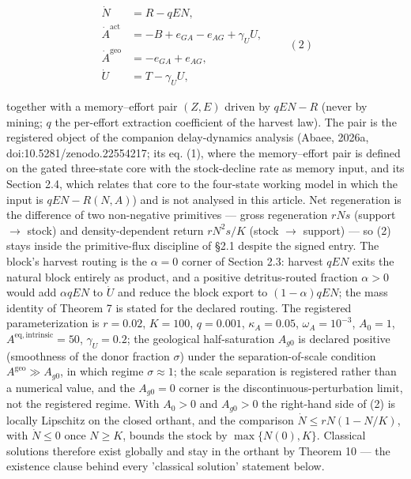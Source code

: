 \documentclass[11pt]{article}
\begin{document}
$$\begin{aligned} \dot N &= R - qEN, \\ \dot A^{\mathrm{act}} &= -B + e_{GA} - e_{AG} + \gamma_U U, \\ \dot A^{\mathrm{geo}} &= -e_{GA} + e_{AG}, \\ \dot U &= T - \gamma_U U, \end{aligned} \qquad (2)$$

 together with a memory--effort pair \((Z, E)\) driven by \(qEN - R\) (never by mining; \(q\) the per-effort extraction coefficient of the harvest law). The pair is the registered object of the companion delay-dynamics analysis (Abaee, 2026a, doi:10.5281/\allowbreak{}zenodo.22554217; its eq. (1), where the memory--effort pair is defined on the gated three-state core with the stock-decline rate as memory input, and its Section 2.4, which relates that core to the four-state working model in which the input is \(qEN - R(N, A)\)) and is not analysed in this article. Net regeneration is the difference of two non-negative primitives --- gross regeneration \(rNs\) (support \(\to\) stock) and density-dependent return \(rN^2s/\allowbreak{}K\) (stock \(\to\) support) --- so (2) stays inside the primitive-flux discipline of \S2.1 despite the signed entry. The block's harvest routing is the \(\alpha = 0\) corner of Section 2.3: harvest \(qEN\) exits the natural block entirely as product, and a positive detritus-routed fraction \(\alpha > 0\) would add \(\alpha qEN\) to \(\dot U\) and reduce the block export to \((1-\alpha)qEN\); the mass identity of Theorem 7 is stated for the declared routing. The registered parameterization is \(r = 0.02\), \(K = 100\), \(q = 0.001\), \(\kappa_A = 0.05\), \(\omega_A = 10^{-3}\), \(A_0 = 1\), \(A^{\mathrm{eq,\allowbreak{}intrinsic}} =\allowbreak{} 50\), \(\gamma_U = 0.2\); the geological half-saturation \(A_{g0}\) is declared positive (smoothness of the donor fraction \(\sigma\)) under the separation-of-scale condition \(A^{\mathrm{geo}} \gg A_{g0}\), in which regime \(\sigma \approx 1\); the scale separation is registered rather than a numerical value, and the \(A_{g0} = 0\) corner is the discontinuous-perturbation limit, not the registered regime. With \(A_0>0\) and \(A_{g0}>0\) the right-hand side of (2) is locally Lipschitz on the closed orthant, and the comparison \(\dot N\le rN(1-N/\allowbreak{}K)\), with \(\dot N\le0\) once \(N\ge K\), bounds the stock by \(\max\{N(0),K\}\). Classical solutions therefore exist globally and stay in the orthant by Theorem 10 --- the existence clause behind every 'classical solution' statement below.
\end{document}
